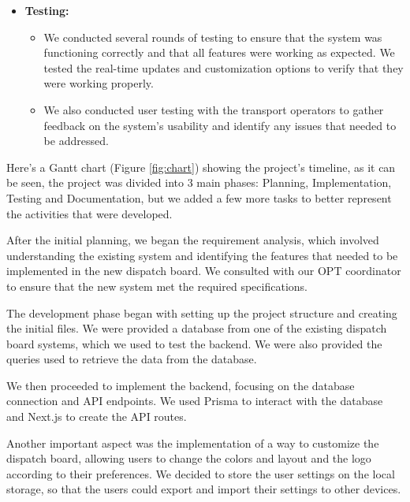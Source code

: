 \documentclass[10pt]{article}
\begin{document}
\begin{itemize}
\begin{itemize}
            \end{itemize}
            \item \textbf{Testing:}
            \begin{itemize}
                \item We conducted several rounds of testing to ensure that the system was functioning correctly and that all features were working as expected. We tested the real-time updates and customization options to verify that they were working properly.
                \item We also conducted user testing with the transport operators to gather feedback on the system's usability and identify any issues that needed to be addressed.
            \end{itemize}
        \end{itemize}

        Here's a Gantt chart (Figure \ref{fig:chart}) showing the project's timeline, as it can be seen, the project was divided into 3 main phases: Planning, Implementation, Testing and Documentation, but we added a few more tasks to better represent the activities that were developed.

        After the initial planning, we began the requirement analysis, which involved understanding the existing system and identifying the features that needed to be implemented in the new dispatch board. We consulted with our OPT coordinator to ensure that the new system met the required specifications.

        The development phase began with setting up the project structure and creating the initial files. We were provided a database from one of the existing dispatch board systems, which we used to test the backend. We were also provided the queries used to retrieve the data from the database.

        We then proceeded to implement the backend, focusing on the database connection and API endpoints. We used Prisma to interact with the database and Next.js to create the API routes.

        Another important aspect was the implementation of a way to customize the dispatch board, allowing users to change the colors and layout and the logo according to their preferences. We decided to store the user settings on the local storage, so that the users could export and import their settings to other devices.
\end{document}
